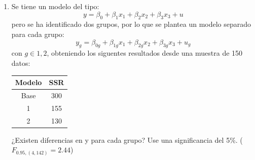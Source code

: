 \documentclass[10pt,a4paper]{article}
\begin{document}
\begin{enumerate}
        \textbf{Solución.}
        \begin{itemize}
          \item Hipótesis equivalente: \( H_0: \beta_1 - 2\beta_2 = 0 \).
          \item Calculamos:
                \[
                  \widehat{\beta}_1 - 2\widehat{\beta}_2 = 4 - 2(1) = 2.
                \]
          \item Calculamos la varianza:
                \[
                  \text{Var}(\widehat{\beta}_1 - 2\widehat{\beta}_2)
                  = \hat{\sigma}^2 \times \left(0.03 + 4(0.02) - 4(0.004)\right)
                  = 80 \times (0.03 + 0.08 - 0.016)
                  = 80 \times 0.094 = 7.52
                \]
          \item Desviación estándar:
                \[
                  s.e.(\widehat{\beta}_1 - 2\widehat{\beta}_2) = \sqrt{7.52} \approx 2.74
                \]
          \item Estadístico \(t\):
                \[
                  t = \frac{2}{2.74} \approx 0.73
                \]
          \item Valor crítico a 5\%: \( t_{2.5\%} \approx 1.96 \).
          \item Como \( |0.73| < 1.96 \), \textbf{no rechazamos \(H_0\)}.
                No existe evidencia suficiente para concluir que
                \(\beta_1\) es diferente de \(2\beta_2\).
        \end{itemize}

\item Se tiene un modelo del tipo:
$$y = \beta_0 + \beta_1x_1 + \beta_2x_2+\beta_3x_3 + u$$
pero se ha identificado dos grupos, por lo que se plantea un modelo separado para cada grupo:
$$y_g = \beta_{0g} + \beta_{1g}x_1 + \beta_{2g}x_2+\beta_{3g}x_3 + u_g$$
con $g\in {1,2}$, obteniendo los siguentes resultados desde una muestra de 150 datos:
\begin{center}
    \begin{tabular}{|c|c|}
    \hline
        Modelo & SSR \\
        \hline
        Base & 300 \\
        \hline
        1 & 155 \\
        \hline
        2 & 130 \\
        \hline
    \end{tabular}
\end{center}
¿Existen diferencias en y para cada grupo? Use una significancia del 5\%. ($F_{0.95,(4,142)}=2.44$)


\end{enumerate}
\end{document}
